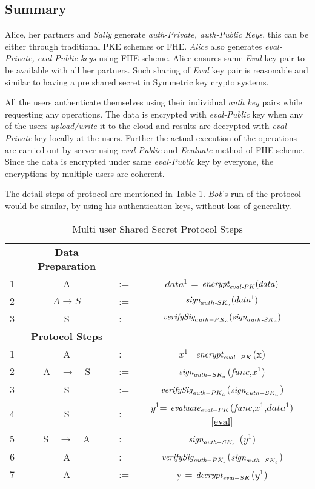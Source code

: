 \documentclass[conference]{IEEEtran}
\numberwithin{equation}{section}
\begin{document}
\subsection{Summary}
Alice, her partners and \emph{Sally}  generate \emph{auth-Private, auth-Public Keys}, this can be either through traditional PKE schemes or FHE. \emph{Alice} also generates \emph{eval-Private, eval-Public keys} using FHE scheme. Alice ensures same \emph{Eval} key pair to be available with all her partners. Such sharing of \emph{Eval} key pair is reasonable and similar to having a pre shared secret in Symmetric key crypto systems.

All the users authenticate themselves using their individual \emph{auth key} pairs while requesting any operations.  The data is encrypted with \emph{eval-Public} key when any of the users \emph{upload/write} it to the cloud and results are decrypted with \emph{eval-Private} key locally at the users. Further the actual execution of the operations are carried out by server using \emph{eval-Public} and \emph{Evaluate} method of FHE scheme.  Since the data is encrypted under same \emph{eval-Public} key by everyone, the encryptions by multiple users are coherent. 

The detail steps of protocol are mentioned in Table \ref{msspProtocol}. \emph{ Bob}'s run of the protocol would be similar, by using his authentication keys, without loss of generality.

\begin{table}
\caption{Multi user Shared Secret Protocol Steps }
\label{msspProtocol}
\renewcommand{\arraystretch}{2.5}
\begin{center}
\begin{tabular} {| c c c c | }
\hline
&\bf{Data Preparation}&&  \\
1 & A &  :=  & $data^1$ =  $\emph{encrypt}_{\emph{eval}\textit{-}PK}(data)$\\
2 & $A \rightarrow S$ & := & $ \emph{sign}_{auth\textit{-}SK_a}(data^1)$\\ 
3 & S &  := & $\emph{verifySig}_{auth-PK_a}(\emph{sign}_{auth\textit{-}SK_a}) $\\
\hline
\hline
&\bf{Protocol Steps}&&\\
{1} & {A} & {:=} & {{$x^1$}=$\emph{encrypt}_{\emph{eval}-PK}$(x)} \\
{2} & {A$\quad \rightarrow \quad$S}&{:=}&{ $\emph{sign}_{\emph{auth}-SK_a}$(\emph{func},$x^1$) } \\
{3}&{S}&{:=} & {$\emph{verifySig}_{\emph{auth}-PK_a}$($\emph{sign}_{auth-SK_a}$)} \\
{4} &{S}&{:=}&{ {$y^1$}= $\emph{evaluate}_{\emph{eval}-PK}$(\emph{func},$x^1$,$data^1$) \eqref{eval}} \\
{5}&{S$\quad \rightarrow \quad$A}&{:=}&{ $\emph{sign}_{\emph{auth}-SK_s}$ ($y^1$)} \\
{6}&{A}&{:=}&{ $\emph{verifySig}_{\emph{auth}-PK_s}$($\emph{sign}_{\emph{auth}-SK_s}$) } \\
{7}&{A}&{:=}&{y =  $\emph{decrypt}_{\emph{eval}-SK}$($y^1$)} \\
\hline
\end{tabular} 
\end{center}
\end{table}
\end{document}
